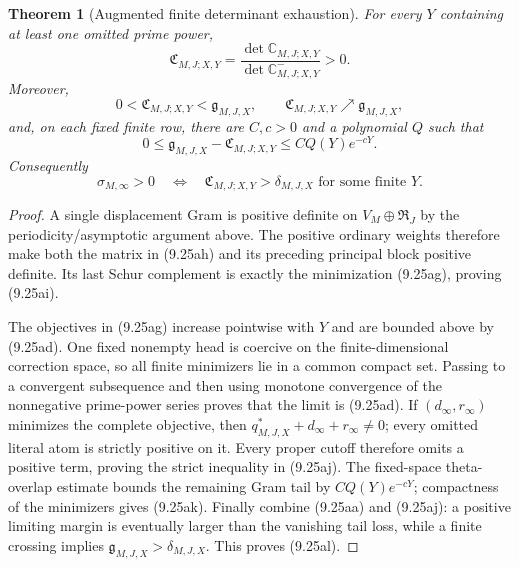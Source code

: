 \documentclass[11pt]{amsart}
\newtheorem{theorem}{Theorem}[section]
\theoremstyle{definition}
\theoremstyle{remark}
\begin{document}
\begin{theorem}[Augmented finite determinant exhaustion]
\label{thm:augmented-exhaustion}
For every \(Y\) containing at least one omitted prime power,
\[
 \boxed{
 \mathfrak C_{M,J;X,Y}
 =\frac{\det\mathbb C_{M,J;X,Y}}
        {\det\mathbb C_{M,J;X,Y}^{-}}>0.}
\tag{9.25ai}
\]
Moreover,
\[
 \boxed{
 0<\mathfrak C_{M,J;X,Y}<\mathfrak g_{M,J,X},\qquad
 \mathfrak C_{M,J;X,Y}\nearrow\mathfrak g_{M,J,X},}
\tag{9.25aj}
\]
and, on each fixed finite row, there are \(C,c>0\) and a polynomial
\(Q\) such that
\[
 0\le\mathfrak g_{M,J,X}-\mathfrak C_{M,J;X,Y}
 \le C Q(Y)e^{-cY}.
\tag{9.25ak}
\]
Consequently
\[
 \boxed{
 \sigma_{M,\infty}>0
 \quad\Longleftrightarrow\quad
 \mathfrak C_{M,J;X,Y}>\delta_{M,J,X}
 \text{ for some finite }Y.}
\tag{9.25al}
\]
\end{theorem}

\begin{proof}
A single displacement Gram is positive definite on
\(V_M\oplus\mathfrak R_J\) by the periodicity/asymptotic argument above.
The positive ordinary weights therefore make both the matrix in
(9.25ah) and its preceding principal block positive definite.  Its last
Schur complement is exactly the minimization (9.25ag), proving
(9.25ai).

The objectives in (9.25ag) increase pointwise with \(Y\) and are bounded
above by (9.25ad).  One fixed nonempty head is coercive on the
finite-dimensional correction space, so all finite minimizers lie in a
common compact set.  Passing to a convergent subsequence and then using
monotone convergence of the nonnegative prime-power series proves that
the limit is (9.25ad).  If \((d_\infty,r_\infty)\) minimizes the complete
objective, then \(q_{M,J,X}^*+d_\infty+r_\infty\ne0\); every omitted
literal atom is strictly positive on it.  Every proper cutoff therefore
omits a positive term, proving the strict inequality in (9.25aj).
The fixed-space theta-overlap estimate bounds the remaining Gram tail by
\(CQ(Y)e^{-cY}\); compactness of the minimizers gives (9.25ak).
Finally combine (9.25aa) and (9.25aj): a positive limiting margin is
eventually larger than the vanishing tail loss, while a finite crossing
implies \(\mathfrak g_{M,J,X}>\delta_{M,J,X}\).  This proves (9.25al).
\end{proof}
\end{document}
